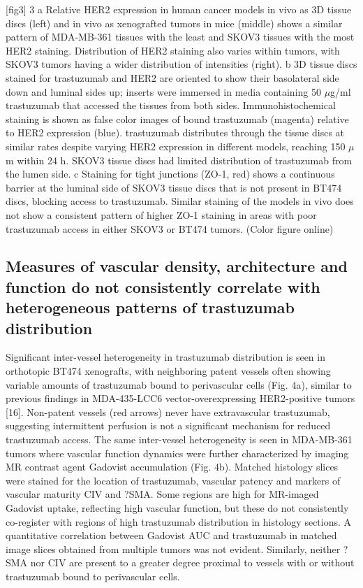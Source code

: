 [fig3]
3
a Relative HER2 expression in human cancer models in vivo as 3D tissue discs (left) and in vivo as xenografted tumors in mice (middle) shows a similar pattern of MDA-MB-361 tissues with the least and SKOV3 tissues with the most HER2 staining.
Distribution of HER2 staining also varies within tumors, with SKOV3 tumors having a wider distribution of intensities (right).
b 3D tissue discs stained for trastuzumab and HER2 are oriented to show their basolateral side down and luminal sides up; inserts were immersed in media containing 50 $\mu$g/ml trastuzumab that accessed the tissues from both sides.
Immunohistochemical staining is shown as false color images of bound trastuzumab (magenta) relative to HER2 expression (blue).
trastuzumab distributes through the tissue discs at similar rates despite varying HER2 expression in different models, reaching 150 $\mu$m within 24 h.
SKOV3 tissue discs had limited distribution of trastuzumab from the lumen side.
c Staining for tight junctions (ZO-1, red) shows a continuous barrier at the luminal side of SKOV3 tissue discs that is not present in BT474 discs, blocking access to trastuzumab.
Similar staining of the models in vivo does not show a consistent pattern of higher ZO-1 staining in areas with poor trastuzumab access in either SKOV3 or BT474 tumors.
(Color figure online)

\subsection{Measures of vascular density, architecture and function do not consistently correlate with heterogeneous patterns of trastuzumab distribution}

Significant inter-vessel heterogeneity in trastuzumab distribution is seen in orthotopic BT474 xenografts, with neighboring patent vessels often showing variable amounts of trastuzumab bound to perivascular cells (Fig.
4a), similar to previous findings in MDA-435-LCC6 vector-overexpressing HER2-positive tumors [16].
Non-patent vessels (red arrows) never have extravascular trastuzumab, suggesting intermittent perfusion is not a significant mechanism for reduced trastuzumab access.
The same inter-vessel heterogeneity is seen in MDA-MB-361 tumors where vascular function dynamics were further characterized by imaging MR contrast agent Gadovist accumulation (Fig.
4b).
Matched histology slices were stained for the location of trastuzumab, vascular patency and markers of vascular maturity CIV and ?SMA.
Some regions are high for MR-imaged Gadovist uptake, reflecting high vascular function, but these do not consistently co-register with regions of high trastuzumab distribution in histology sections.
A quantitative correlation between Gadovist AUC and trastuzumab in matched image slices obtained from multiple tumors was not evident.
Similarly, neither ?SMA nor CIV are present to a greater degree proximal to vessels with or without trastuzumab bound to perivascular cells.

